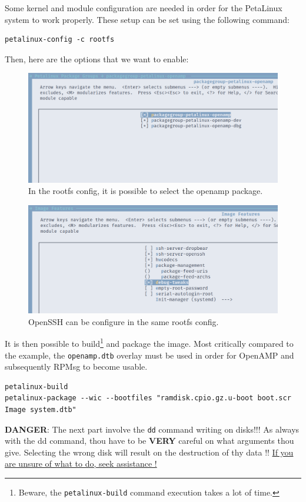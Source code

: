 \documentclass[10pt]{article}
\begin{document}
Some kernel and module configuration are needed in order for the PetaLinux system to work properly.
These setup can be set using the following command:
\begin{verbatim}
petalinux-config -c rootfs
\end{verbatim}

Then, here are the options that we want to enable:
\begin{figure}[htbp]
\centering
\includegraphics[width=.6\textwidth]{./img/yocto_openamp.png}
\caption{\label{fig:org78bacf8}In the rootfs config, it is possible to select the openamp package.}
\end{figure}


\begin{figure}[htbp]
\centering
\includegraphics[width=.6\textwidth]{./img/yocto_ssh.png}
\caption{\label{fig:org237c941}OpenSSH can be configure in the same rootfs config.}
\end{figure}

It is then possible to build\footnote{Beware, the \texttt{petalinux-build} command execution takes a lot of time.\label{org43c52f2}} and package the image. Most critically compared to the example,
the \texttt{openamp.dtb} overlay must be used in order for OpenAMP and subsequently RPMsg to become usable.
\begin{verbatim}
petalinux-build
petalinux-package --wic --bootfiles "ramdisk.cpio.gz.u-boot boot.scr Image system.dtb"
\end{verbatim}

\begin{tcolorbox}[colback=red!5!white,colframe=red!75!black]
\textbf{DANGER}: The next part involve the \texttt{dd} command writing on disks!!!
As always with the dd command, thou have to be \textbf{VERY} careful on what arguments
thou give. Selecting the wrong disk will result on the destruction of
thy data !!
\uline{If you are unsure of what to do, seek assistance !}
\end{tcolorbox}
\end{document}
